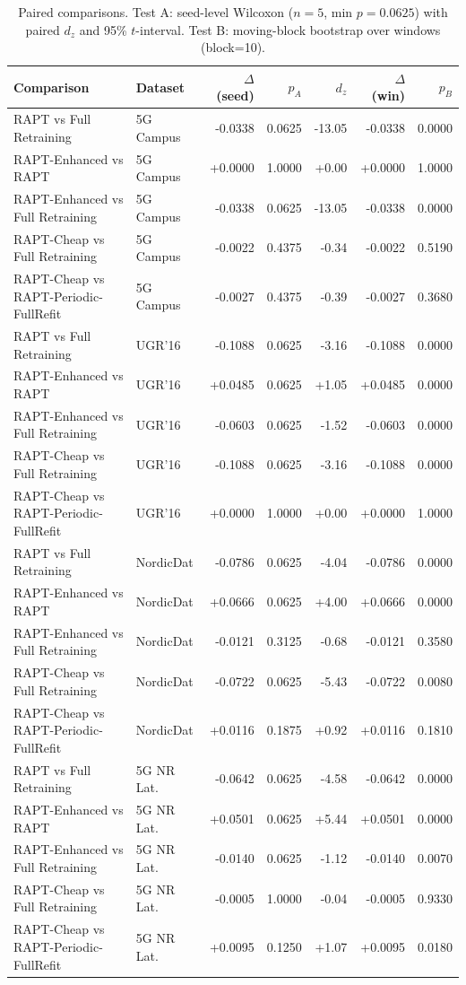 \begin{table}[t]
\caption{Paired comparisons. Test A: seed-level Wilcoxon ($n=5$, min $p=0.0625$) with paired $d_z$ and 95\% $t$-interval. Test B: moving-block bootstrap over windows (block=10).}
\label{tab:stats}
\centering
\scriptsize
\begin{tabular}{@{}llrrrrr@{}}
\toprule
\textbf{Comparison} & \textbf{Dataset} & \textbf{$\Delta$ (seed)} & \textbf{$p_A$} & \textbf{$d_z$} & \textbf{$\Delta$ (win)} & \textbf{$p_B$} \\
\midrule
RAPT vs Full Retraining & 5G Campus & -0.0338 & 0.0625 & -13.05 & -0.0338 & 0.0000 \\
RAPT-Enhanced vs RAPT & 5G Campus & +0.0000 & 1.0000 & +0.00 & +0.0000 & 1.0000 \\
RAPT-Enhanced vs Full Retraining & 5G Campus & -0.0338 & 0.0625 & -13.05 & -0.0338 & 0.0000 \\
RAPT-Cheap vs Full Retraining & 5G Campus & -0.0022 & 0.4375 & -0.34 & -0.0022 & 0.5190 \\
RAPT-Cheap vs RAPT-Periodic-FullRefit & 5G Campus & -0.0027 & 0.4375 & -0.39 & -0.0027 & 0.3680 \\
RAPT vs Full Retraining & UGR'16 & -0.1088 & 0.0625 & -3.16 & -0.1088 & 0.0000 \\
RAPT-Enhanced vs RAPT & UGR'16 & +0.0485 & 0.0625 & +1.05 & +0.0485 & 0.0000 \\
RAPT-Enhanced vs Full Retraining & UGR'16 & -0.0603 & 0.0625 & -1.52 & -0.0603 & 0.0000 \\
RAPT-Cheap vs Full Retraining & UGR'16 & -0.1088 & 0.0625 & -3.16 & -0.1088 & 0.0000 \\
RAPT-Cheap vs RAPT-Periodic-FullRefit & UGR'16 & +0.0000 & 1.0000 & +0.00 & +0.0000 & 1.0000 \\
RAPT vs Full Retraining & NordicDat & -0.0786 & 0.0625 & -4.04 & -0.0786 & 0.0000 \\
RAPT-Enhanced vs RAPT & NordicDat & +0.0666 & 0.0625 & +4.00 & +0.0666 & 0.0000 \\
RAPT-Enhanced vs Full Retraining & NordicDat & -0.0121 & 0.3125 & -0.68 & -0.0121 & 0.3580 \\
RAPT-Cheap vs Full Retraining & NordicDat & -0.0722 & 0.0625 & -5.43 & -0.0722 & 0.0080 \\
RAPT-Cheap vs RAPT-Periodic-FullRefit & NordicDat & +0.0116 & 0.1875 & +0.92 & +0.0116 & 0.1810 \\
RAPT vs Full Retraining & 5G NR Lat. & -0.0642 & 0.0625 & -4.58 & -0.0642 & 0.0000 \\
RAPT-Enhanced vs RAPT & 5G NR Lat. & +0.0501 & 0.0625 & +5.44 & +0.0501 & 0.0000 \\
RAPT-Enhanced vs Full Retraining & 5G NR Lat. & -0.0140 & 0.0625 & -1.12 & -0.0140 & 0.0070 \\
RAPT-Cheap vs Full Retraining & 5G NR Lat. & -0.0005 & 1.0000 & -0.04 & -0.0005 & 0.9330 \\
RAPT-Cheap vs RAPT-Periodic-FullRefit & 5G NR Lat. & +0.0095 & 0.1250 & +1.07 & +0.0095 & 0.0180 \\
\bottomrule
\end{tabular}
\end{table}
